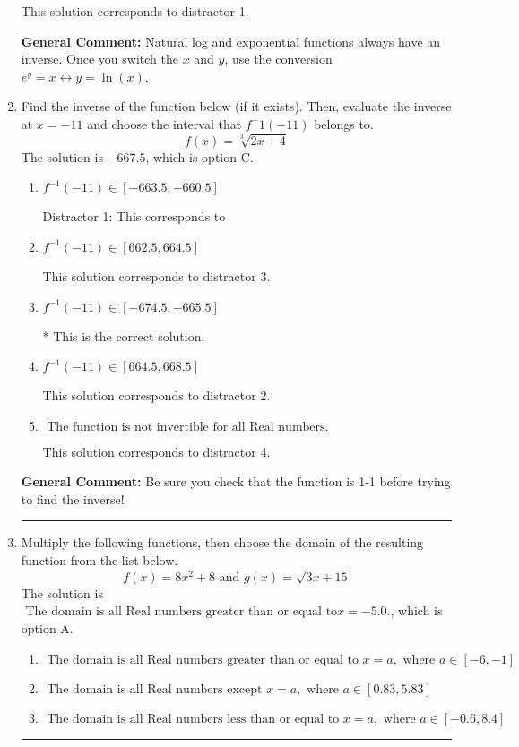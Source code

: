 \documentclass{extbook}[14pt]
\newcommand{\litem}[1]{\item #1

\rule{\textwidth}{0.4pt}}
\begin{document}
\begin{enumerate}
{\begin{enumerate}[label=\Alph*.]
 This solution corresponds to distractor 1.
\end{enumerate}

\textbf{General Comment:} Natural log and exponential functions always have an inverse. Once you switch the $x$ and $y$, use the conversion $ e^y = x \leftrightarrow y=\ln(x)$.
}
\litem{
Find the inverse of the function below (if it exists). Then, evaluate the inverse at $x = -11$ and choose the interval that $f^-1(-11)$ belongs to.
\[ f(x) = \sqrt[3]{2 x + 4} \]The solution is \( -667.5 \), which is option C.\begin{enumerate}[label=\Alph*.]
\item \( f^{-1}(-11) \in [-663.5, -660.5] \)

 Distractor 1: This corresponds to 
\item \( f^{-1}(-11) \in [662.5, 664.5] \)

 This solution corresponds to distractor 3.
\item \( f^{-1}(-11) \in [-674.5, -665.5] \)

* This is the correct solution.
\item \( f^{-1}(-11) \in [664.5, 668.5] \)

 This solution corresponds to distractor 2.
\item \( \text{ The function is not invertible for all Real numbers. } \)

 This solution corresponds to distractor 4.
\end{enumerate}

\textbf{General Comment:} Be sure you check that the function is 1-1 before trying to find the inverse!
}
\litem{
Multiply the following functions, then choose the domain of the resulting function from the list below.
\[ f(x) = 8x^{2} + 8 \text{ and } g(x) = \sqrt{3x+15}  \]The solution is \( \text{ The domain is all Real numbers greater than or equal to} x = -5.0. \), which is option A.\begin{enumerate}[label=\Alph*.]
\item \( \text{ The domain is all Real numbers greater than or equal to } x = a, \text{ where } a \in [-6, -1] \)


\item \( \text{ The domain is all Real numbers except } x = a, \text{ where } a \in [0.83, 5.83] \)


\item \( \text{ The domain is all Real numbers less than or equal to } x = a, \text{ where } a \in [-0.6, 8.4] \)



\end{enumerate}}
\end{enumerate}
\end{document}
